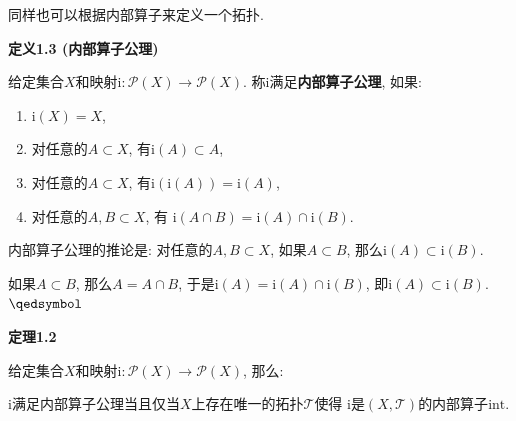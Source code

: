 \documentclass[UTF8]{ctexart}
\begin{document}
同样也可以根据内部算子来定义一个拓扑.

\vspace{10pt}

\hypertarget{sec:定义1.3}{}
\noindent\textbf{定义1.3 (内部算子公理)}

给定集合$X$和映射$\mathrm{i}:\mathcal{P}(X)\to\mathcal{P}(X)$.
称$\mathrm{i}$满足\textbf{内部算子公理}, 如果:
\begin{enumerate}
    \item $\mathrm{i}(X)=X$,
    \item 对任意的$A\subset X$, 有$\mathrm{i}(A)\subset A$,
    \item 对任意的$A\subset X$, 有$\mathrm{i}(\mathrm{i}(A))=\mathrm{i}(A)$,
    \item 对任意的$A,B\subset X$, 有
    $\mathrm{i}(A\cap B)=\mathrm{i}(A)\cap\mathrm{i}(B)$.
\end{enumerate}

\vspace{10pt}

内部算子公理的推论是: 对任意的$A,B\subset X$,
如果$A\subset B$, 那么$\mathrm{i}(A)\subset\mathrm{i}(B)$.


如果$A\subset B$, 那么$A=A\cap B$,
于是$\mathrm{i}(A)=\mathrm{i}(A)\cap\mathrm{i}(B)$,
即$\mathrm{i}(A)\subset\mathrm{i}(B)$. \hfill $\qedsymbol$

\vspace{10pt}

\hypertarget{sec:定理1.2}{}
\noindent\textbf{定理1.2}

给定集合$X$和映射$\mathrm{i}:\mathcal{P}(X)\to\mathcal{P}(X)$, 那么:

$\mathrm{i}$满足内部算子公理当且仅当$X$上存在唯一的拓扑$\mathcal{T}$使得
$\mathrm{i}$是$(X,\mathcal{T})$的内部算子$\mathrm{int}$.


\end{document}
